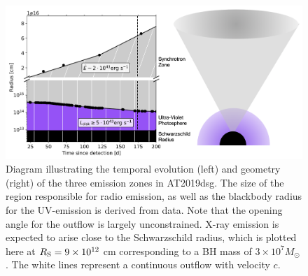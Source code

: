 \documentclass{nature_plusfigure}
\newcommand{\Msol}{\mbox{$M_{\odot}$}}
\begin{document}
\begin{figure}
\includegraphics[width=\textwidth]{figures/Bran_schema_2.png}
\caption{Diagram illustrating the temporal evolution (left) and geometry (right) of the three emission zones in AT2019dsg. The size of the region responsible for radio emission, as well as the blackbody radius for the UV-emission is derived from data. Note that the opening angle for the outflow is largely unconstrained. X-ray emission is expected to arise close to the Schwarzschild radius, which is plotted here at $R_{\textup{S}} = 9 \times 10^{12}$ cm corresponding to a BH mass of $3 \times 10^7 \Msol$. The white lines represent a continuous outflow with velocity $c$.}
\label{fig:diagram}
\end{figure}

\clearpage
\end{document}
